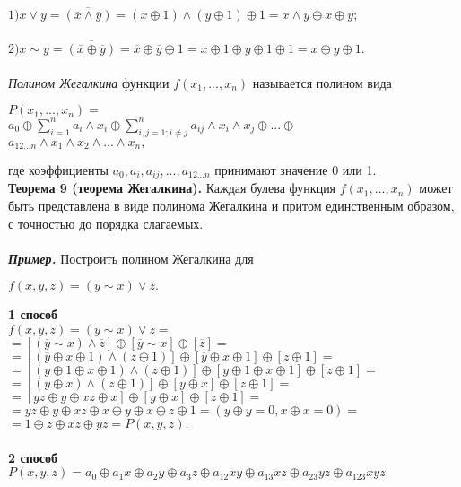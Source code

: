 \documentclass{article}
\begin{document}
	$1) x \vee y = \overline{(\overline{x} \wedge \overline{y})} = (x \oplus 1) \wedge (y \oplus 1) \oplus 1 = x \wedge y \oplus x \oplus y;$
	\\\\
	$2) x \sim y = \overline{(\overline{x} \oplus \overline{y})} = \overline{x} \oplus \overline{y} \oplus 1 = x \oplus 1 \oplus y \oplus 1 \oplus 1 = x \oplus y \oplus 1.$
	\\\\
	\textit{Полином Жегалкина} функции $f(x_1, ..., x_n)$ называется полином вида\\
	\begin{center}
	$P(x_1, ..., x_n) = $
	\\
	$a_0 \oplus \sum\limits_{i=1}^{n} a_i \wedge x_i \oplus \sum\limits_{i, j = 1; i \neq j}^{n} a_{ij} \wedge x_i \wedge x_j \oplus ... \oplus$
	\\
	$a_{12...n} \wedge x_1 \wedge x_2 \wedge ... \wedge x_n,$
	\end{center}
	где коэффициенты $a_0, a_i, a_{ij}, ..., a_{12...n}$ принимают значение 0 или 1.
	\\
	\textbf{Теорема 9 (теорема Жегалкина).} Каждая булева функция $f(x_1, ..., x_n)$ может быть представлена в виде полинома Жегалкина и притом
	единственным образом, с точностью до порядка слагаемых.
	\\\\
	\underline{\textit{\textbf{Пример.}}} Построить полином Жегалкина для
	\begin{center}
		$f(x, y, z) = (\overline{y} \sim x) \vee \overline{z}.$
	\end{center}

	\textbf{1 способ}\\
	$f (x, y, z) = (\overline{y} \sim x) \vee \overline{z} =$\\
	$= [(\overline{y} \sim x) \wedge \overline{z}] \oplus [\overline{y} \sim x] \oplus [\overline{z}] =$\\
	$= [(\overline{y} \oplus x \oplus 1) \wedge (z \oplus 1)] \oplus [\overline{y} \oplus x \oplus 1] \oplus [z \oplus 1] =$\\
	$= [(y \oplus 1 \oplus x \oplus 1) \wedge (z \oplus 1)] \oplus [y \oplus 1 \oplus x \oplus 1] \oplus [z \oplus 1] =$\\
	$= [(y \oplus x) \wedge (z \oplus 1)] \oplus [y \oplus x] \oplus [z \oplus 1] =$\\
	$= [yz \oplus y \oplus xz \oplus x] \oplus [y \oplus x] \oplus [z \oplus 1] =$\\
	$= yz \oplus y \oplus xz \oplus x \oplus y \oplus x \oplus z \oplus 1 = (y \oplus y = 0, x \oplus x = 0) =$\\
	$= 1 \oplus z \oplus xz \oplus yz = P(x, y, z).$
	\\\\
	\textbf{2 способ}\\
	$P(x, y, z) = a_0 \oplus a_1 x \oplus a_2 y \oplus a_3 z \oplus a_{12} xy \oplus a_{13} xz \oplus a_{23} yz \oplus a_{123}xyz$
	
\end{document}
